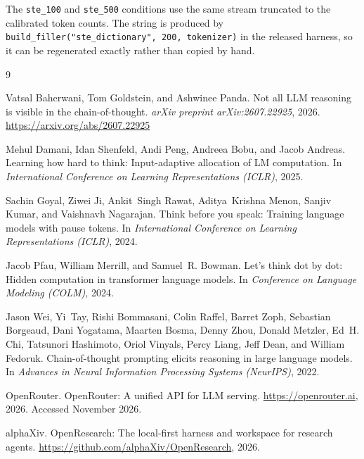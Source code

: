 \documentclass[11pt,a4paper]{article}
\begin{document}
The \texttt{ste\_100} and \texttt{ste\_500} conditions use the same stream
truncated to the calibrated token counts. The string is produced by
\texttt{build\_filler("ste\_dictionary", 200, tokenizer)} in the released
harness, so it can be regenerated exactly rather than copied by hand.

\begin{thebibliography}{9}

Vatsal Baherwani, Tom Goldstein, and Ashwinee Panda.
\newblock Not all {LLM} reasoning is visible in the chain-of-thought.
\newblock \emph{arXiv preprint arXiv:2607.22925}, 2026.
\newblock \url{https://arxiv.org/abs/2607.22925}

Mehul Damani, Idan Shenfeld, Andi Peng, Andreea Bobu, and Jacob Andreas.
\newblock Learning how hard to think: Input-adaptive allocation of {LM}
computation.
\newblock In \emph{International Conference on Learning Representations
(ICLR)}, 2025.

Sachin Goyal, Ziwei Ji, Ankit~Singh Rawat, Aditya~Krishna Menon, Sanjiv Kumar,
and Vaishnavh Nagarajan.
\newblock Think before you speak: Training language models with pause tokens.
\newblock In \emph{International Conference on Learning Representations
(ICLR)}, 2024.

Jacob Pfau, William Merrill, and Samuel~R. Bowman.
\newblock Let's think dot by dot: Hidden computation in transformer language
models.
\newblock In \emph{Conference on Language Modeling (COLM)}, 2024.

Jason Wei, Yi~Tay, Rishi Bommasani, Colin Raffel, Barret Zoph, Sebastian
Borgeaud, Dani Yogatama, Maarten Bosma, Denny Zhou, Donald Metzler, Ed~H. Chi,
Tatsunori Hashimoto, Oriol Vinyals, Percy Liang, Jeff Dean, and William
Fedoruk.
\newblock Chain-of-thought prompting elicits reasoning in large language
models.
\newblock In \emph{Advances in Neural Information Processing Systems
(NeurIPS)}, 2022.

OpenRouter.
\newblock OpenRouter: A unified API for {LLM} serving.
\newblock \url{https://openrouter.ai}, 2026. Accessed November 2026.

alphaXiv.
\newblock OpenResearch: The local-first harness and workspace for research
agents.
\newblock \url{https://github.com/alphaXiv/OpenResearch}, 2026.

\end{thebibliography}
\end{document}
